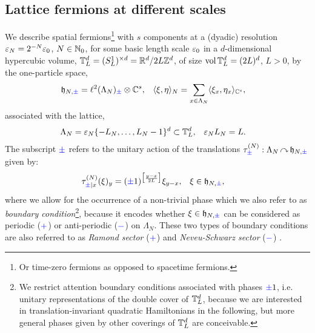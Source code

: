 \documentclass[a4paper, 11pt]{article}
\newcommand{\fh}{\mathfrak{h}}
\newcommand{\ltwo}{\ell^{2}}
\DeclareMathOperator{\1}{\mathds{1}}
\DeclareMathOperator{\vol}{vol}
\DeclareMathOperator{\act}{\curvearrowright}
\begin{document}
\subsection{Lattice fermions at different scales}
\label{sec:latfermi}
We describe spatial fermions\footnote{Or time-zero fermions as opposed to spacetime fermions.} with $s$ components at a (dyadic) resolution $\varepsilon_{N}=2^{-N}\varepsilon_{0}$, $N\in\mathbb{N}_{0}$, for some basic length scale $\varepsilon_{0}$ in a $d$-dimensional hypercubic volume, $\mathbb{T}^{d}_{L} = (S^{1}_{L})^{\times d} = \mathbb{R}^{d}/2L\mathbb{Z}^{d}$, of size $\vol \T^{d}_{L} = (2L)^{d}$, $L>0$, by the one-particle space,
\begin{align}
\label{eq:1psp}
\fh_{N,{\color{blue}\pm}} & = \ltwo(\Lambda_{N})_{{\color{blue}\pm}}\otimes\C^{s}, & \langle\xi,\eta\rangle_{N} & = \sum_{x\in\Lambda_{N}}\langle\xi_{x},\eta_{x}\rangle_{\C^{s}}, 
\end{align}
associated with the lattice,
\begin{align}
\label{eq:latsp}
\Lambda_{N} & = \varepsilon_{N}\{-L_{N},\dots,L_{N}-1\}^{d}\subset\mathbb{T}^{d}_{L}, & \varepsilon_{N}L_{N} & = L.
\end{align}
The subscript ${\color{blue}\pm}$ refers to the unitary action of the translations $\tau^{(N)}_{{\color{blue}\pm}}:\Lambda_{N}\act\fh_{N,{\color{blue}\pm}}$ given by:
\begin{align}
\label{eq:translations}
\tau^{(N)}_{{\color{blue}\pm} |x}(\xi)_{y} & = ({\color{blue}\pm} 1)^{\big[\frac{y-x}{2L}\big]}\xi_{y-x}, & \xi & \in\fh_{N, {\color{blue}\pm}},
\end{align}
where we allow for the occurrence of a non-trivial phase which we also refer to as \textit{boundary condition}\footnote{We restrict attention boundary conditions associated with phases ${\color{blue}\pm} 1$, i.e. unitary representations of the double cover of $\mathbb{T}^{d}_{L}$, because we are interested in translation-invariant quadratic Hamiltonians in the following, but more general phases given by other coverings of $\mathbb{T}^{d}_{L}$ are conceivable.}, because it encodes whether $\xi\in\fh_{N, {\color{blue}\pm}}$ can be considered as periodic (${\color{blue}+} $) or anti-periodic (${\color{blue}-}$) on $\Lambda_{N}$. These two types of boundary conditions are also referred to as \textit{Ramond sector} (${\color{blue}+}$) and \textit{Neveu-Schwarz sector} (${\color{blue}-}$) \cite{DiFrancescoCFTBook, EvansQuantumSymmetriesOn}.
\end{document}
